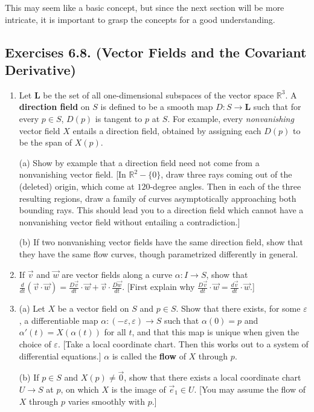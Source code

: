 \documentclass[leqno]{book}
\begin{document}
This may seem like a basic concept, but since the next section will be more intricate, it is important to grasp the concepts for a good understanding.

\subsection*{Exercises 6.8. (Vector Fields and the Covariant Derivative)}
\begin{enumerate}
\item Let $\mathbf L$ be the set of all one-dimensional subspaces of the vector space $\mathbb R^3$.  A \textbf{direction field} on $S$ is defined to be a smooth map $D:S\to\mathbf L$ such that for every $p\in S$, $D(p)$ is tangent to $p$ at $S$.  For example, every \emph{nonvanishing} vector field $X$ entails a direction field, obtained by assigning each $D(p)$ to be the span of $X(p)$.

(a) Show by example that a direction field need not come from a nonvanishing vector field.  [In $\mathbb R^2-\{0\}$, draw three rays coming out of the (deleted) origin, which come at $120$-degree angles.  Then in each of the three resulting regions, draw a family of curves asymptotically approaching both bounding rays.  This should lead you to a direction field which cannot have a nonvanishing vector field without entailing a contradiction.]

(b) If two nonvanishing vector fields have the same direction field, show that they have the same flow curves, though parametrized differently in general.

\item If $\vec v$ and $\vec w$ are vector fields along a curve $\alpha:I\to S$, show that $\frac d{dt}(\vec v\cdot\vec w)=\frac{D\vec v}{dt}\cdot\vec w+\vec v\cdot\frac{D\vec w}{dt}$.  [First explain why $\frac{D\vec v}{dt}\cdot\vec w=\frac{d\vec v}{dt}\cdot\vec w$.]

\item (a) Let $X$ be a vector field on $S$ and $p\in S$.  Show that there exists, for some $\varepsilon$, a differentiable map $\alpha:(-\varepsilon,\varepsilon)\to S$ such that $\alpha(0)=p$ and $\alpha'(t)=X(\alpha(t))$ for all $t$, and that this map is unique when given the choice of $\varepsilon$.  [Take a local coordinate chart.  Then this works out to a system of differential equations.] $\alpha$ is called the \textbf{flow} of $X$ through $p$.

(b) If $p\in S$ and $X(p)\ne\vec 0$, show that there exists a local coordinate chart $U\to S$ at $p$, on which $X$ is the image of $\vec e_1\in U$.  [You may assume the flow of $X$ through $p$ varies smoothly with $p$.]


\end{enumerate}
\end{document}
